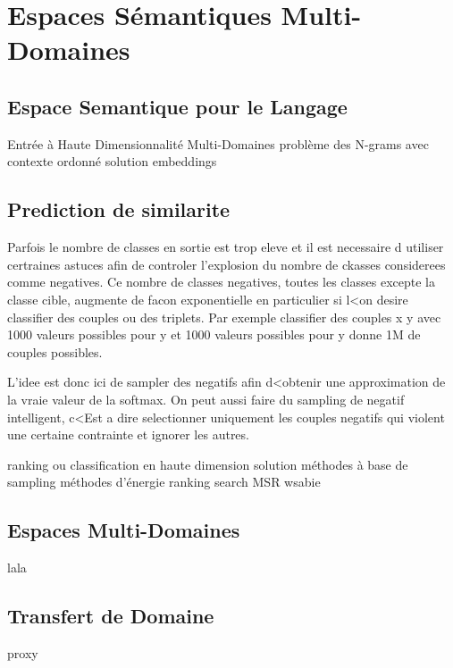 \chapter{Espaces Sémantiques Multi-Domaines}



\section{Espace Semantique pour le Langage}

Entrée à Haute Dimensionnalité
Multi-Domaines
problème des N-grams avec contexte ordonné
solution embeddings

\section{Prediction de similarite}

Parfois le nombre de classes en sortie est trop eleve et il est necessaire d
utiliser certraines astuces afin de controler l'explosion du nombre de ckasses
considerees comme negatives. Ce nombre de classes negatives, toutes les classes
excepte la classe cible, augmente de facon exponentielle en particulier si l<on
desire classifier des couples ou des triplets. Par exemple classifier des
couples x y avec 1000 valeurs possibles pour y et 1000 valeurs possibles pour y
donne 1M de couples possibles.

L'idee est donc ici de sampler des negatifs afin d<obtenir une approximation de
la vraie valeur de la softmax.  On peut aussi faire du sampling de negatif
intelligent, c<Est a dire selectionner uniquement les couples negatifs qui
violent une certaine contrainte et ignorer les autres.

ranking ou classification en haute dimension
solution méthodes à base de sampling
méthodes d'énergie ranking
search MSR
wsabie

\section{Espaces Multi-Domaines}

lala

\section{Transfert de Domaine}

proxy
